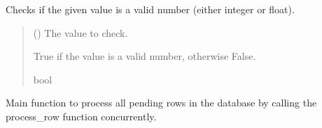 \documentclass[letterpaper,10pt,english]{sphinxmanual}
\begin{document}

\begin{fulllineitems}
\label{\detokenize{modules.data_storage:modules.data_storage.llm_analyse.is_valid_number}}
\pysigstartsignatures
\pysiglinewithargsret
{}
{}
{}
\pysigstopsignatures
\sphinxAtStartPar
Checks if the given value is a valid number (either integer or float).
\begin{quote}\begin{description}
\sphinxAtStartPar
{} () \textendash{} The value to check.

\sphinxAtStartPar
True if the value is a valid number, otherwise False.

\sphinxAtStartPar
bool

\end{description}\end{quote}

\end{fulllineitems}


\begin{fulllineitems}
\label{\detokenize{modules.data_storage:modules.data_storage.llm_analyse.main}}
\pysigstartsignatures
\pysiglinewithargsret
{}
{}
{}
\pysigstopsignatures
\sphinxAtStartPar
Main function to process all pending rows in the database by calling the process\_row function concurrently.

\end{fulllineitems}

\end{document}
